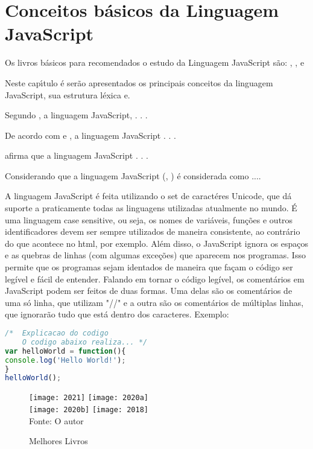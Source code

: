 

\chapter{ Conceitos b\'{a}sicos da Linguagem JavaScript}

Os livros b\'{a}sicos para recomendados o estudo da Linguagem JavaScript s\~{a}o: \cite{Scott2021}, \cite{Flanagan2020}, \cite{Scott2020} e \cite{Morgan2018}

Neste cap\'{\i}tulo \'{e} serão apresentados os principais conceitos da linguagem JavaScript, sua estrutura léxica e.

Segundo \cite{seb11}, a linguagem JavaScript,  . . .

De acordo com \cite{seb11} e \cite{roy04}, a linguagem JavaScript . . .

\cite{seb11} afirma que a linguagem JavaScript . . .

Considerando que a linguagem JavaScript (\cite{seb11}, \cite{wat90}) \'{e} considerada como ....

A linguagem JavaScript é feita utilizando o set de caractéres Unicode, que dá suporte a praticamente todas as linguagens utilizadas
atualmente no mundo. É uma linguagem case sensitive, ou seja, os nomes de variáveis, funções e outros identificadores devem ser sempre utilizados de maneira consistente, ao contrário do que acontece no html, por exemplo. %
Além disso, o JavaScript ignora os espaços e as quebras de linhas (com algumas exceções) que aparecem nos programas. Isso permite que os programas sejam identados de maneira que façam o código ser legível e fácil de entender.
Falando em tornar o código legível, os comentários em JavaScript podem ser feitos de duas formas. Uma delas são os comentários de uma só linha, que utilizam "//" e a outra são os comentários de múltiplas linhas, que ignorarão tudo que está dentro dos caracteres.
Exemplo:
\newline
\begin{lstlisting}[language=JavaScript]
/*  Explicacao do codigo
	O codigo abaixo realiza... */
var helloWorld = function(){
console.log('Hello World!');
}
helloWorld();
\end{lstlisting}
 


   \begin{figure}[H]
    \begin{center}
        \caption{Melhores Livros} \label{livros}
        \texttt{[image: 2021]} \texttt{[image: 2020a]}\\
                \texttt{[image: 2020b]} \texttt{[image: 2018]}\\
        {\tiny \sf Fonte: O autor }
    \end{center}
   \end{figure} 
